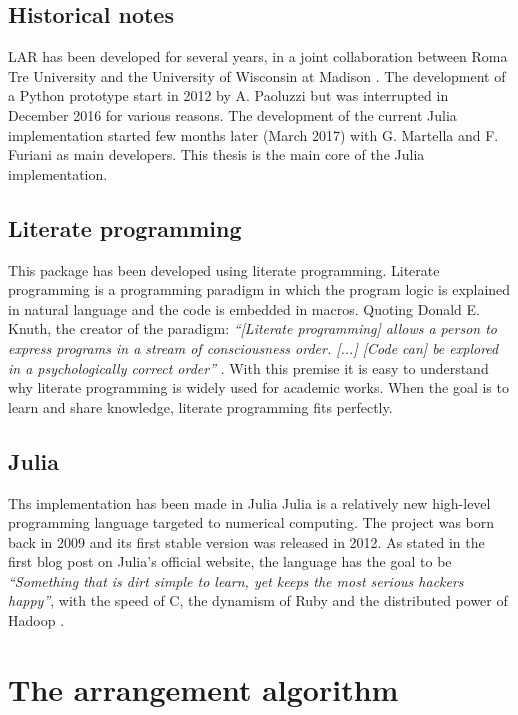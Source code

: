 \section{Historical notes}
\label{sec:history}
LAR has been developed for several years, in a joint collaboration 
between Roma Tre University and the University 
of Wisconsin at Madison \cite{ieee-tase}. The development of a Python 
prototype start in 2012 by A. Paoluzzi but was interrupted 
in December 2016 for various reasons. The development of the current
Julia implementation started few months later (March 2017) with
G. Martella and F. Furiani as main developers. This thesis is
the main core of the Julia implementation.


\section{Literate programming}
This package has been developed using literate programming.
Literate programming is a programming paradigm in which the program
logic is explained in natural language and the code is embedded in macros.
Quoting Donald E. Knuth, the creator of the paradigm: 
\textit{``[Literate programming] allows a person to express programs in a stream of
consciousness order. [...] [Code can] be explored
in a psychologically correct order''} \cite{knuth}. 
With this premise it is easy to understand why literate programming 
is widely used for academic works.
When the goal is to learn and share knowledge, literate programming fits perfectly.


\section{Julia}

Ths implementation has been made in Julia
Julia is a relatively new high-level programming language targeted 
to numerical computing. The project was born back in 2009 and its first
stable version was released in 2012. As stated in the first blog post
on Julia's official website, the language has the goal
to be \textit{``Something that is dirt simple to learn, 
yet keeps the most serious hackers happy''}, with the speed of C, 
the dynamism of Ruby and the distributed power of Hadoop
\cite{julia}.


\chapter{The arrangement algorithm}
\label{ch:arrangement_algorithm}

